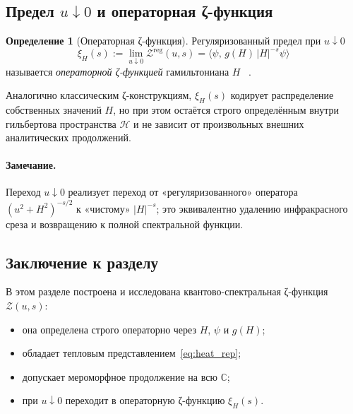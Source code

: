 \documentclass{article}
\numberwithin{equation}{section}
\theoremstyle{plain}
\theoremstyle{definition}
\newtheorem{definition}{Определение}
\theoremstyle{remark}
\begin{document}
\subsection{\texorpdfstring{Предел $u\downarrow0$ и операторная ζ-функция}{Предел u ⇒ 0 и операторная ζ-функция}}

\label{subsec:u_limit}

\begin{definition}[Операторная ζ-функция]
\label{def:xi}
Регуляризованный предел при $u\downarrow0$
\begin{equation}
\xi_H(s)
:=\lim_{u\downarrow0}\mathcal Z^{\mathrm{reg}}(u,s)
=\big\langle \psi,\,g(H)\,|H|^{-s}\psi\big\rangle
\end{equation}
называется \emph{операторной ζ-функцией} гамильтониана $H$ ~\cite{Grubb1996}.
\end{definition}

\noindent
Аналогично классическим ζ-конструкциям, $\xi_H(s)$ кодирует распределение собственных значений $H$, но при этом остаётся строго определённым внутри гильбертова пространства $\mathcal H$ и не зависит от произвольных внешних аналитических продолжений.

\paragraph{Замечание.}  
Переход $u\downarrow0$ реализует переход от «регуляризованного» оператора $(u^2+H^2)^{-s/2}$ к «чистому» $|H|^{-s}$; это эквивалентно удалению инфракрасного среза и возвращению к полной спектральной функции.

\subsection{Заключение к разделу}
\label{subsec:summary4}

В этом разделе построена и исследована квантово-спектральная ζ-функция $\mathcal Z(u,s)$:
\begin{itemize}
  \item она определена строго операторно через $H$, $\psi$ и $g(H)$;
  \item обладает тепловым представлением~\eqref{eq:heat_rep};
  \item допускает мероморфное продолжение на всю $\mathbb C$;
  \item при $u\downarrow0$ переходит в операторную ζ-функцию $\xi_H(s)$.
\end{itemize}
\end{document}
